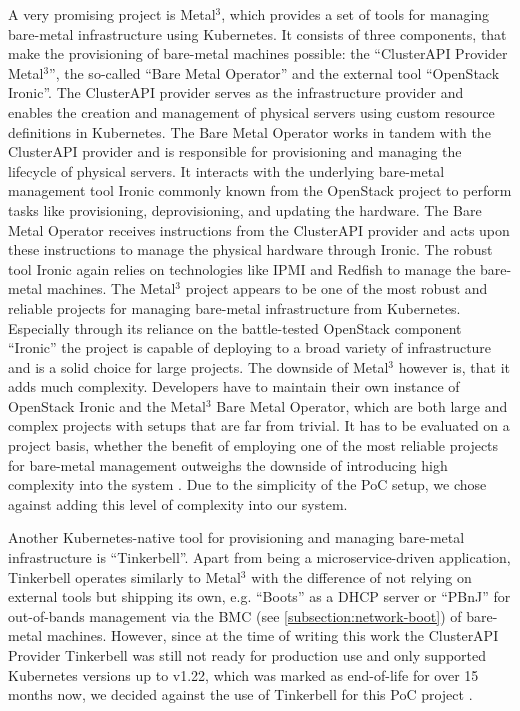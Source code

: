         A very promising project is Metal$^3$, which provides a set of tools for managing bare-metal infrastructure using Kubernetes. It consists of three components, that make the provisioning of bare-metal machines possible: the ``ClusterAPI Provider Metal$^3$'', the so-called ``Bare Metal Operator'' and the external tool ``OpenStack Ironic''. The ClusterAPI provider serves as the infrastructure provider and enables the creation and management of physical servers using custom resource definitions in Kubernetes. The Bare Metal Operator works in tandem with the ClusterAPI provider and is responsible for provisioning and managing the lifecycle of physical servers. It interacts with the underlying bare-metal management tool Ironic commonly known from the OpenStack project to perform tasks like provisioning, de\-pro\-vi\-sio\-ning, and updating the hardware. The Bare Metal Operator receives instructions from the ClusterAPI provider and acts upon these instructions to manage the physical hardware through Ironic. The robust tool Ironic again relies on technologies like IPMI and Redfish to manage the bare-metal machines. The Metal$^3$ project appears to be one of the most robust and reliable projects for managing bare-metal infrastructure from Kubernetes. Especially through its reliance on the battle-tested OpenStack component ``Ironic'' the project is capable of deploying to a broad variety of infrastructure and is a solid choice for large projects. The downside of Metal$^3$ however is, that it adds much complexity. Developers have to maintain their own instance of OpenStack Ironic and the Metal$^3$ Bare Metal Operator, which are both large and complex projects with setups that are far from trivial. It has to be evaluated on a project basis, whether the benefit of employing one of the most reliable projects for bare-metal management outweighs the downside of introducing high complexity into the system \cite{metal3_docs, metal3_bare_metal_operator}. Due to the simplicity of the PoC setup, we chose against adding this level of complexity into our system. \newline

        Another Kubernetes-native tool for provisioning and managing bare-metal infrastructure is ``Tinkerbell''. Apart from being a microservice-driven application, Tinkerbell operates similarly to Metal$^3$ with the difference of not relying on external tools but shipping its own, e.g. ``Boots'' as a DHCP server or ``PBnJ'' for out-of-bands management via the BMC (see \autoref{subsection:network-boot}) of bare-metal machines. However, since at the time of writing this work the ClusterAPI Provider Tinkerbell was still not ready for production use and only supported Kubernetes versions up to v1.22, which was marked as end-of-life for over 15 months now, we decided against the use of Tinkerbell for this PoC project \cite{tinkerbell}. \newline
        

